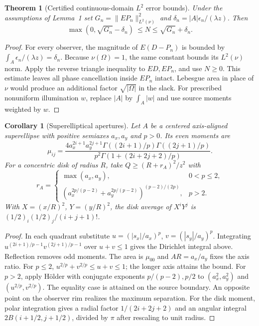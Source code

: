 \documentclass[11pt]{article}
\newtheorem{theorem}{Theorem}
\newtheorem{corollary}{Corollary}
\begin{document}
\begin{theorem}[Certified continuous-domain $L^2$ error bounds]
Under the assumptions of Lemma~1 set $G_n=\|EP_n\|_{L^2(\nu)}^2$
and $\delta_n=|A|\epsilon_n/(\lambda z)$. Then
\[
 \max(0,\sqrt{G_n}-\delta_n)\ \le N\le\sqrt{G_n}+\delta_n .
\]
\end{theorem}
\begin{proof}
For every observer, the magnitude of $E(D-P_n)$ is bounded by
$\int_A\epsilon_n/(\lambda z)=\delta_n$. Because $\nu(\Omega)=1$,
the same constant bounds its $L^2(\nu)$ norm. Apply the reverse triangle
inequality to $ED,EP_n$, and use $N\ge0$. This estimate leaves all
phase cancellation inside $EP_n$ intact. Lebesgue area in place of
$\nu$ would produce an additional factor $\sqrt{|\Omega|}$ in the slack.
For prescribed nonuniform illumination $w$, replace $|A|$ by
$\int_A |w|$ and use source moments weighted by $w$.
\end{proof}

\begin{corollary}[Superelliptical apertures]
Let $A$ be a centered axis-aligned superellipse with positive semiaxes
$a_x,a_y$ and $p>0$. Its even moments are
\[
 \mu_{ij}=\frac{4a_x^{2i+1}a_y^{2j+1}
 \Gamma((2i+1)/p)\Gamma((2j+1)/p)}
 {p^2\Gamma(1+(2i+2j+2)/p)}.
\]
For a concentric disk of radius $R$, take $Q\ge (R+r_A)^2/z^2$ with
\[
 r_A=\begin{cases}\max(a_x,a_y),&0<p\le2,\\
 (a_x^{2p/(p-2)}+a_y^{2p/(p-2)})^{(p-2)/(2p)},&p>2.
 \end{cases}
\]
With $X=(x/R)^2$, $Y=(y/R)^2$, the disk average of $X^iY^j$ is
$(1/2)_i(1/2)_j/(i+j+1)!$.
\end{corollary}
\begin{proof}
In each quadrant substitute $u=(|s_x|/a_x)^p$,
$v=(|s_y|/a_y)^p$. Integrating $u^{(2i+1)/p-1}v^{(2j+1)/p-1}$
over $u+v\le1$ gives the Dirichlet integral above. Reflection removes
odd moments. The area is $\mu_{00}$ and $AR=a_x/a_y$ fixes the axis ratio.
For $p\le2$, $u^{2/p}+v^{2/p}\le u+v\le1$; the longer axis attains
the bound. For $p>2$, apply H\"older with conjugate exponents
$p/(p-2),p/2$ to $(a_x^2,a_y^2)$ and $(u^{2/p},v^{2/p})$.
The equality case is attained on the source boundary. An opposite
point on the observer rim realizes the maximum separation.
For the disk moment, polar integration gives a radial factor
$1/(2i+2j+2)$ and an angular integral
$2B(i+1/2,j+1/2)$, divided by $\pi$ after rescaling to unit radius.
\end{proof}
\end{document}
